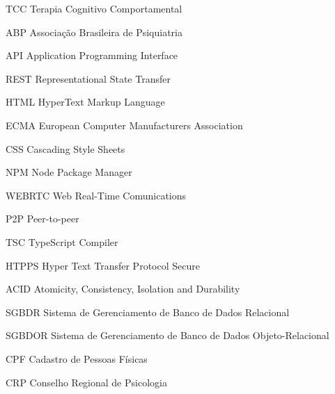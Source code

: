 \begin{siglas}
    \item[TCC] Terapia Cognitivo Comportamental
    \item[ABP] Associação Brasileira de Psiquiatria 
    \item[API] Application Programming Interface
    \item[REST] Representational State Transfer
    \item[HTML] HyperText Markup Language
    \item[ECMA] European Computer Manufacturers Association
    \item[CSS] Cascading Style Sheets 
    \item[NPM] Node Package Manager
    \item[WEBRTC] Web Real-Time Comunications
    \item[P2P] Peer-to-peer
    \item[TSC] TypeScript Compiler
    \item[HTPPS] Hyper Text Transfer Protocol Secure
    \item[ACID] Atomicity, Consistency, Isolation and Durability
    \item[SGBDR] Sistema de Gerenciamento de Banco de Dados Relacional   
    \item[SGBDOR] Sistema de Gerenciamento de Banco de Dados Objeto-Relacional  
    \item[CPF] Cadastro de Pessoas Físicas
    \item[CRP] Conselho Regional de Psicologia 
\end{siglas}
